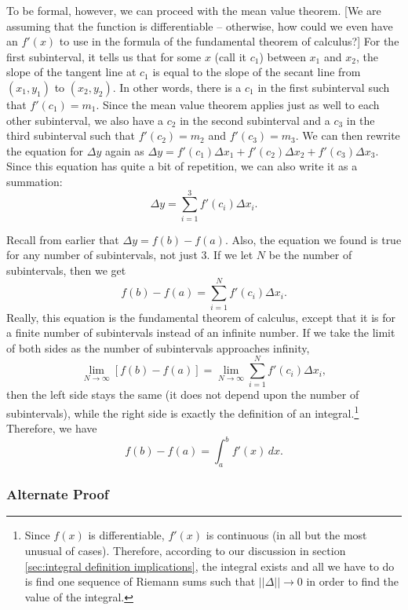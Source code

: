 \documentclass{myarticle}
\theoremstyle{nospace}
\newtheorem{old series theorem}{Theorem}
\newenvironment{series theorem}{\begin{mdframed}\begin{old series theorem}}{\end{old series theorem}\end{mdframed}}
\begin{document}
To be formal, however, we can proceed with the mean value theorem. [We are assuming that the function is differentiable -- otherwise, how could we even have an $f'(x)$ to use in the formula of the fundamental theorem of calculus?] For the first subinterval, it tells us that for some $x$ (call it $c_1$) between $x_1$ and $x_2$, the slope of the tangent line at $c_1$ is equal to the slope of the secant line from $(x_1, y_1)$ to $(x_2, y_2)$. In other words, there is a $c_1$ in the first subinterval such that $f'(c_1) = m_1$. Since the mean value theorem applies just as well to each other subinterval, we also have a $c_2$ in the second subinterval and a $c_3$ in the third subinterval such that $f'(c_2) = m_2$ and $f'(c_3) = m_3$. We can then rewrite the equation for $\Delta y$ again as $\Delta y = f'(c_1)\Delta x_1 + f'(c_2)\Delta x_2 + f'(c_3)\Delta x_3$. Since this equation has quite a bit of repetition, we can also write it as a summation: \[ \Delta y = \sum_{i=1}^3 f'(c_i)\Delta x_i. \]

Recall from earlier that $\Delta y = f(b) - f(a)$. Also, the equation we found is true for any number of subintervals, not just 3. If we let $N$ be the number of subintervals, then we get \[ f(b) - f(a) = \sum_{i=1}^N f'(c_i)\Delta x_i. \] Really, this equation is the fundamental theorem of calculus, except that it is for a finite number of subintervals instead of an infinite number. If we take the limit of both sides as the number of subintervals approaches infinity, \[ \lim_{N \to \infty} [f(b) - f(a)] = \lim_{N \to \infty} \sum_{i=1}^N f'(c_i)\Delta x_i, \] then the left side stays the same (it does not depend upon the number of subintervals), while the right side is exactly the definition of an integral.\footnote{Since $f(x)$ is differentiable, $f'(x)$ is continuous (in all but the most unusual of cases\footnotemark). Therefore, according to our discussion in section \ref{sec:integral definition implications}, the integral exists and all we have to do is find one sequence of Riemann sums such that $||\Delta|| \to 0$ in order to find the value of the integral.} Therefore, we have \[ f(b) - f(a) = \int_a^b f'(x) \,dx. \]

\subsubsection{Alternate Proof} \label{sec:ftc alternate proof}
\end{document}
